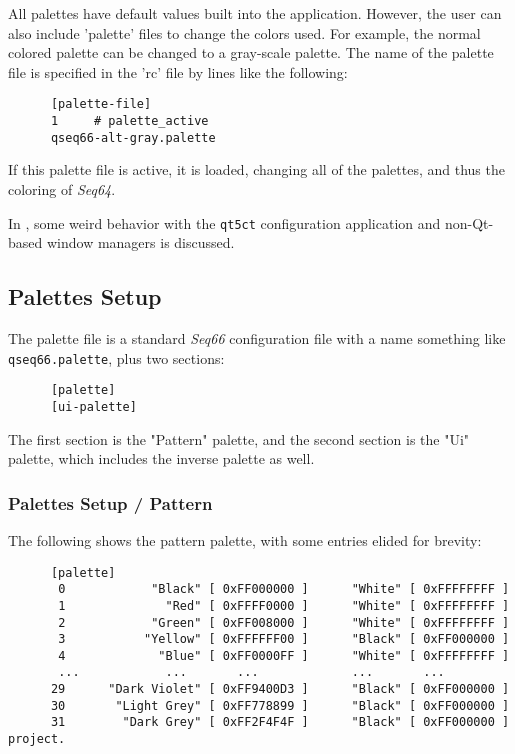    All palettes have default values built into the application.  However, the
   user can also include 'palette' files to change the colors used.  For
   example, the normal colored palette can be changed to a gray-scale palette.
   The name of the palette file is specified in the 'rc' file by lines like the
   following:

   \begin{verbatim}
      [palette-file]
      1     # palette_active
      qseq66-alt-gray.palette
   \end{verbatim}

   If this palette file is active, it is loaded, changing all of the palettes,
   and thus the coloring of \textsl{Seq64}.

   In , some weird behavior with
   the \texttt{qt5ct} configuration application and non-Qt-based window managers
   is discussed.

\subsection{Palettes Setup}
\label{subsec:palettes_setup}

   The palette file is a standard \textsl{Seq66} configuration file with a name
   something like \texttt{qseq66.palette}, plus two sections:

   \begin{verbatim}
      [palette]
      [ui-palette]
   \end{verbatim}

   The first section is the "Pattern" palette, and the second section is the
   "Ui" palette, which includes the inverse palette as well.

\subsubsection{Palettes Setup / Pattern}
\label{subsubsec:palettes_setup_pattern}

   The following shows the pattern palette, with some entries elided for
   brevity:

   \begin{verbatim}
      [palette]
       0            "Black" [ 0xFF000000 ]      "White" [ 0xFFFFFFFF ]
       1              "Red" [ 0xFFFF0000 ]      "White" [ 0xFFFFFFFF ]
       2            "Green" [ 0xFF008000 ]      "White" [ 0xFFFFFFFF ]
       3           "Yellow" [ 0xFFFFFF00 ]      "Black" [ 0xFF000000 ]
       4             "Blue" [ 0xFF0000FF ]      "White" [ 0xFFFFFFFF ]
       ...            ...       ...             ...       ...
      29      "Dark Violet" [ 0xFF9400D3 ]      "Black" [ 0xFF000000 ]
      30       "Light Grey" [ 0xFF778899 ]      "Black" [ 0xFF000000 ]
      31        "Dark Grey" [ 0xFF2F4F4F ]      "Black" [ 0xFF000000 ]
project.
   \end{verbatim}

